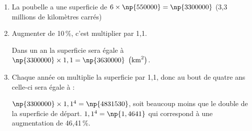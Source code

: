 
\medskip

%
 
\begin{enumerate}
\item %
La poubelle a une superficie de $6 \times \np{550000} = \np{3300000}$ (3,3 millions de kilomètres carrés) 
\item %
Augmenter de 10\,\%, c'est multiplier par 1,1.

Dans un an la superficie sera égale à $\np{3300000} \times 1,1 = \np{3630000}~\left(\text{km}^2\right)$.
\item %
Chaque année on multiplie la superficie par 1,1, donc au bout de quatre ans celle-ci sera égale à :

$\np{3300000} \times 1,1^4 = \np{4831530}$, soit beaucoup moins que le double de la superficie de départ. $1,1^4 = \np{1,4641}$ qui correspond à une augmentation de 46,41\,\%.
\end{enumerate}
 
\bigskip

